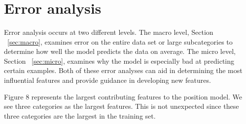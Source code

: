 \documentclass[letterpaper]{article}
\begin{document}
\section{Error analysis}
\paragraph{} Error analysis occurs at two different levels.  The macro level, Section ~\ref{sec:macro}, examines error on the entire data set or large subcategories to determine how well the model predicts the data on average.  The micro level, Section ~\ref{sec:micro}, examines why the model is especially bad at predicting certain examples.  Both of these error analyses can aid in determining the most influential features and provide guidance in developing new features.  

Figure 8 represents the largest contributing features to the position model.  We see three categories as the largest features.  This is not unexpected since these three categories are the largest in the training set.  
\end{document}
